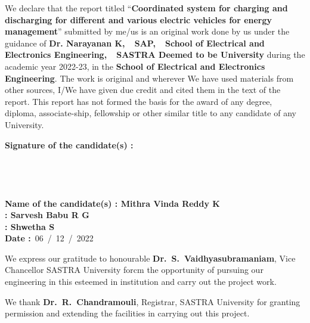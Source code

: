\documentclass[a4paper, 12pt, oneside]{sastra}
\begin{document}
		\begin{doublespace}
		\linespread{2}
		
		We declare that the report titled ``\textbf{Coordinated system for charging and discharging for different and various electric vehicles for energy management}'' submitted by me/us is an original work done by us under the guidance of \textbf{Dr. Narayanan K,~~SAP,~~School of Electrical and Electronics Engineering,~~SASTRA Deemed to be University} during the academic year 2022-23, in the \textbf{School of Electrical and Electronics Engineering}. The work is original and wherever We have used materials from other sources, I/We have given due credit and cited them in the text of the report. This report has not formed the basis for the award of any degree, diploma, associate-ship, fellowship or other similar title to any candidate of any University.\\
		
	\end{doublespace}
	\noindent \textbf{Signature of the candidate(s)	:}	
	\\
	\\
	\\
	\\
	\\
	\noindent\textbf{Name of the candidate(s)\hspace{7mm}		: Mithra Vinda Reddy K}\\
	\hspace*{53mm}\textbf{: Sarvesh Babu R G}\\
	\hspace*{53mm}\textbf{: Shwetha S}\\
	\noindent\textbf{Date\hspace*{43.5mm}					:}~06~/~12~/~2022\\%
	
	\acknowledgements
	
	\hspace*{12pt} We express our gratitude to honourable \textbf{Dr.~S.~Vaidhyasubramaniam}, Vice Chancellor SASTRA University forcm the opportunity of pursuing our engineering in this esteemed in institution and carry out the project work.
	
	\par We thank \textbf{Dr.~R.~Chandramouli}, Registrar, SASTRA University for granting permission and extending the facilities in carrying out this project.
	
\end{document}
